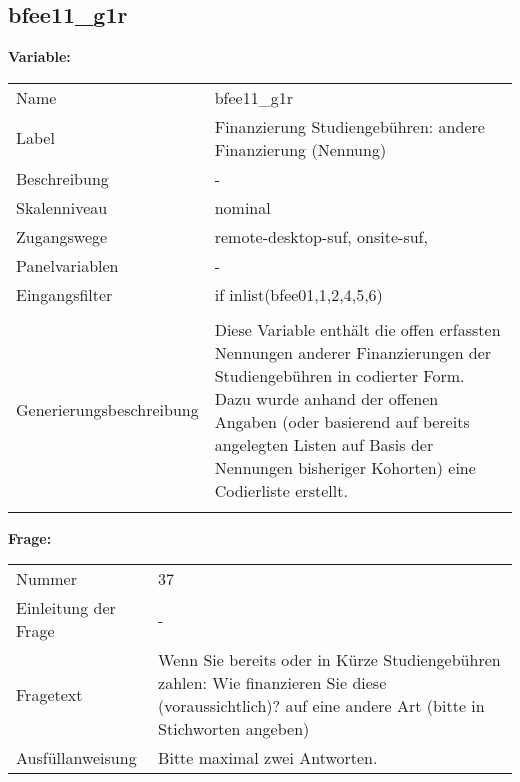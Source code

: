 	
	
	\subsection{bfee11\_g1r}
	\label{subSection:bfee11_g1r}

	\noindent\textbf{Variable:}\\
		\begin{tabular}{lL{11.3cm}}
			\label{tableVariable:bfee11_g1r}
			Name & bfee11\_g1r \\
			Label & Finanzierung Studiengebühren: andere Finanzierung (Nennung) \\
			Beschreibung & - \\
			Skalenniveau & nominal \\
			Zugangswege &
				remote-desktop-suf,
				onsite-suf,
 \\
			Panelvariablen & -
			 \\
			Eingangsfilter & if inlist(bfee01,1,2,4,5,6) \\
 \\
					Generierungsbeschreibung & Diese Variable enthält die offen erfassten Nennungen anderer Finanzierungen der Studiengebühren in codierter Form. Dazu wurde anhand der offenen Angaben (oder basierend auf bereits angelegten Listen auf Basis der Nennungen bisheriger Kohorten) eine Codierliste erstellt.
				 \\	
			 \\
		\end{tabular}

		\vspace*{1 cm}
		\noindent\textbf{Frage:}\\
		\begin{tabular}{lL{11.3cm}}
			\label{tableQuestion:bfee11_g1r}
			Nummer & 37 \\
			Einleitung der Frage & - \\
			Fragetext & Wenn Sie bereits oder in Kürze Studiengebühren zahlen: Wie finanzieren Sie diese (voraussichtlich)?
auf eine andere Art (bitte in Stichworten angeben) \\
			Ausfüllanweisung & Bitte maximal zwei Antworten. \\
		\end{tabular}






